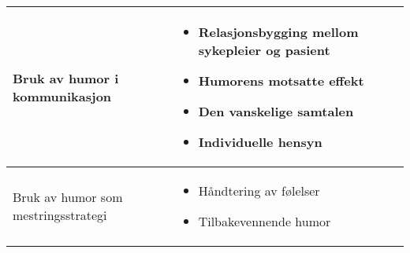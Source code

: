 \begin{table}[h]
  \centering
  \begin{tabularx}{\textwidth}{|l|X|}
    \hline
    Bruk av humor i kommunikasjon &
      \begin{itemize}
        \item Relasjonsbygging mellom sykepleier og pasient
        \item Humorens motsatte effekt
        \item Den vanskelige samtalen
        \item Individuelle hensyn
      \end{itemize}
      \\ \hline
    Bruk av humor som mestringsstrategi &
      \begin{itemize}
        \item Håndtering av følelser
        \item Tilbakevennende humor
      \end{itemize}
      \\ \hline
  \end{tabularx}
\end{table}

